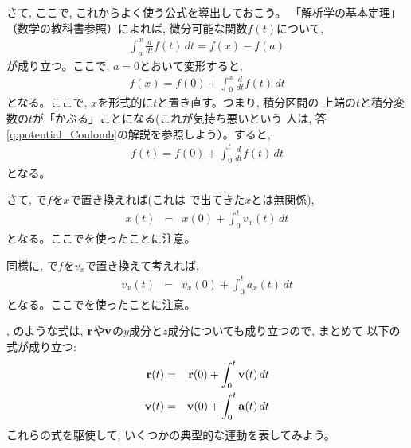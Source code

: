 さて, ここで, これからよく使う公式を導出しておこう。
「解析学の基本定理」（数学の教科書参照）によれば, 
微分可能な関数$f(t)$について, 
\begin{eqnarray}
\int_a^x\frac{d}{dt}f(t)\,dt=f(x)-f(a)\label{eq:ftsekibun00}
\end{eqnarray}
が成り立つ。ここで, $a=0$とおいて変形すると, 
\begin{eqnarray}
f(x)=f(0)+\int_0^x\frac{d}{dt}f(t)\,dt
\end{eqnarray}
となる。ここで, $x$を形式的に$t$と置き直す。つまり, 積分区間の
上端の$t$と積分変数の$t$が「かぶる」ことになる(これが気持ち悪いという
人は, 答\ref{q:potential_Coulomb}の解説を参照しよう）。すると, 
\begin{eqnarray}
f(t)=f(0)+\int_{0}^{t}\frac{d}{dt}f(t)\,dt\label{eq:ftsekibun}
\end{eqnarray}
となる。

さて, で$f$を$x$で置き換えれば(これは
で出てきた$x$とは無関係), 
\begin{eqnarray}
x(t)&=&x(0)+\int_{0}^{t}v_x(t)\, dt\label{eq:xfromvx}
\end{eqnarray}
となる。ここでを使ったことに注意。

同様に, で$f$を$v_x$で置き換えて考えれば, 
\begin{eqnarray}
v_x(t)&=&v_x(0)+\int_{0}^{t}a_x(t)\, dt\label{eq:vxfromax}
\end{eqnarray}
となる。ここでを使ったことに注意。

, のような式は, 
${\bf r}$や${\bf v}$の$y$成分と$z$成分についても成り立つので, まとめて
以下の式が成り立つ:
\begin{eqnarray}
{\bf r}(t)&=&{\bf r}(0)+\int_{0}^{t}{\bf v}(t)\, dt\label{eq:rfromv_vec}\\
{\bf v}(t)&=&{\bf v}(0)+\int_{0}^{t}{\bf a}(t)\, dt\label{eq:vfroma_vec}
\end{eqnarray}
これらの式を駆使して, いくつかの典型的な運動を表してみよう。
\hv

